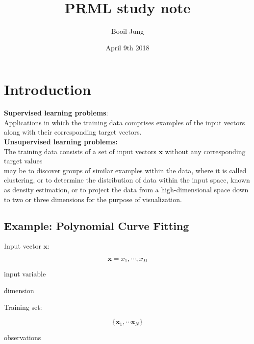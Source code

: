 \documentclass[11pt, a4paper, oneside]{book}
\begin{document}
\title{PRML study note}
\author{Booil Jung}
\date{April 9th 2018}
\maketitle

\chapter{Introduction}

\noindent
\textbf{Supervised learning problems}: \\
Applications in which the training data comprises examples of the input vectors along with their corresponding target vectors.
\\

\noindent
\textbf{Unsupervised learning problems:} \\
The training data consists of a set of input vectors $\mathbf{x}$ without any corresponding target values
\\

\noindent
may be to discover groups of similar examples within the data,
where it is called clustering, or to determine the distribution of data within the input space, known as density estimation, or to project the data from a high-dimensional space down to two or three dimensions for the purpose of visualization.

\section{Example: Polynomial Curve Fitting}

\noindent
Input vector $\mathbf{x}$:

$$
\mathbf{x} = { x_1, \cdots , x_D }
$$
\begin{description}[labelwidth=\widthof{\bfseries 1234567890},align=parright]
	\item[$x:$] input variable
	\item[$D:$] dimension
\end{description}

\bigskip

\noindent
Training set: 

$$
\{ \mathbf{x}_1, \cdots \mathbf{x}_N \}
$$

\begin{description}[labelwidth=\widthof{\bfseries 1234567890},align=parright]
	\item[$N:$] observations
\end{description}
\end{document}
